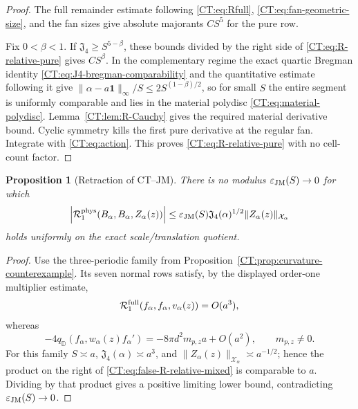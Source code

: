 \documentclass[11pt]{amsart}
\numberwithin{equation}{section}
\newtheorem{proposition}[theorem]{Proposition}
\theoremstyle{definition}
\theoremstyle{remark}
\newcommand{\Jfour}{\mathfrak J_4}
\newcommand{\qD}{q_{\mathbb D}}
\newcommand{\Rfull}{\mathcal R_1^{\rm full}}
\newcommand{\Rphys}{\mathcal R_1^{\rm phys}}
\newcommand{\X}{\mathcal X}
\begin{document}
\begin{proof}
The full remainder estimate following \eqref{CT:eq:Rfull},
\eqref{CT:eq:fan-geometric-size}, and the fan sizes give absolute majorants
$CS^5$ for the pure row.

Fix $0<\beta<1$.  If $\Jfour\ge S^{5-\beta}$, these bounds divided by the
right side of \eqref{CT:eq:R-relative-pure} gives $CS^\beta$.
In the complementary regime the exact quartic Bregman identity
\eqref{CT:eq:J4-bregman-comparability} and the quantitative estimate following
it give
$\|\alpha-a\mathbf1\|_\infty/S\le2S^{(1-\beta)/2}$, so for small $S$ the
entire segment is uniformly comparable and lies in the material polydisc
\eqref{CT:eq:material-polydisc}.
Lemma~\ref{CT:lem:R-Cauchy} gives the required material derivative bound.
Cyclic symmetry kills the first pure derivative at the regular fan.
Integrate with \eqref{CT:eq:action}.  This proves
\eqref{CT:eq:R-relative-pure} with no cell-count factor.
\end{proof}

\begin{proposition}[Retraction of CT--JM]
\label{CT:prop:joint-mixed-counterexample}
There is no modulus $\varepsilon_{\rm JM}(S)\to0$ for which
\begin{equation}\label{CT:eq:false-R-relative-mixed}
 \left|\Rphys(B_\alpha,B_\alpha,Z_\alpha(z))\right|
 \le\varepsilon_{\rm JM}(S)\Jfour(\alpha)^{1/2}
       \|Z_\alpha(z)\|_{\X_\alpha}
\end{equation}
holds uniformly on the exact scale/translation quotient.
\end{proposition}

\begin{proof}
Use the three-periodic family from
Proposition~\ref{CT:prop:curvature-counterexample}.  Its seven normal rows
satisfy, by the displayed order-one multiplier estimate,
\[
 \Rfull(f_\alpha,f_\alpha,v_\alpha(z))=O(a^3),
\]
whereas
\[
 -4\qD(f_\alpha,w_\alpha(z)f_\alpha')
 =-8\pi d^2m_{p,z}a+O(a^2),\qquad m_{p,z}\ne0.
\]
For this family $S\asymp a$,
$\Jfour(\alpha)\asymp a^3$, and
$\|Z_\alpha(z)\|_{\X_\alpha}\asymp a^{-1/2}$; hence the product on the
right of \eqref{CT:eq:false-R-relative-mixed} is comparable to $a$.  Dividing
by that product gives a positive limiting lower bound, contradicting
$\varepsilon_{\rm JM}(S)\to0$.
\end{proof}
\end{document}

